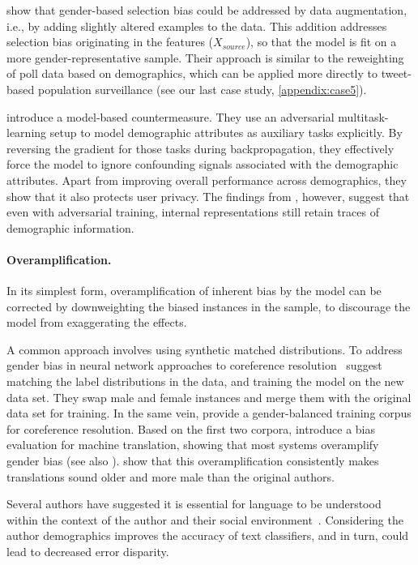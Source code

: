 \documentclass[11pt,a4paper]{article}
\begin{document}
 show that gender-based selection bias could be addressed by data augmentation, i.e., by adding slightly altered examples to the data.
This addition addresses selection bias originating in the features ($X_{source}$), so that the model is fit on a more gender-representative sample.
Their approach is similar to the reweighting of poll data based on demographics, which can be applied more directly to tweet-based population surveillance (see our last case study, \ref{appendix:case5}).

 introduce a model-based countermeasure. They use an adversarial multitask-learning setup to model demographic attributes as auxiliary tasks explicitly. By reversing the gradient for those tasks during backpropagation, they effectively force the model to ignore confounding signals associated with the demographic attributes. Apart from improving overall performance across demographics, they show that it also protects user privacy. The findings from , however, suggest that even with adversarial training, internal representations still retain traces of demographic information.


\paragraph{Overamplification.}
In its simplest form, overamplification of inherent bias by the model can be corrected by downweighting the biased instances in the sample, to discourage the model from exaggerating the effects.

A common approach involves using synthetic matched distributions. 
To address gender bias in neural network approaches to coreference resolution~ suggest matching the label distributions in the data, and training the model on the new data set. They swap male and female instances and merge them with the original data set for training. 
In the same vein,  provide a gender-balanced training corpus for coreference resolution. Based on the first two corpora,  introduce a bias evaluation for machine translation, showing that most systems overamplify gender bias (see also ).  show that this overamplification consistently makes translations sound older and more male than the original authors.

Several authors have suggested it is essential for language to be understood within the context of the author and their social environment~.
Considering the author demographics improves the accuracy of text classifiers, and in turn, could lead to decreased error disparity. 
\end{document}

